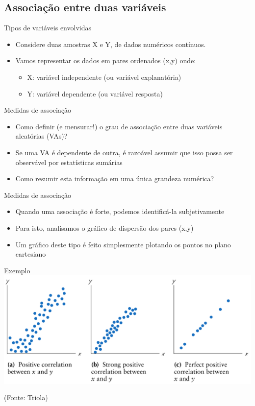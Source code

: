 \documentclass{beamer}
\begin{document}
\subsection[Associação]{Associação entre duas variáveis}

\begin{frame}{Tipos de variáveis envolvidas}
  \begin{itemize}
  \item Considere duas amostras X e Y, de dados numéricos contínuos.
  \item Vamos representar os dados em pares ordenados (x,y) onde:
    \begin{itemize}
    \item X: variável independente (ou variável explanatória)
    \item Y: variável dependente (ou variável resposta)
    \end{itemize}
  \end{itemize}
\end{frame}

\begin{frame}{Medidas de associação}
  \begin{itemize}
  \item Como definir (e mensurar!) o grau de associação entre duas
    variáveis aleatórias (VAs)?
  \item Se uma VA é dependente de outra, é razoável assumir que isso
    possa ser observável por estatísticas sumárias
  \item Como resumir esta informação em uma única grandeza numérica?
  \end{itemize}
\end{frame}

\begin{frame}{Medidas de associação}
  \begin{itemize}
  \item Quando uma associação é forte, podemos identificá-la
    subjetivamente
  \item Para isto, analisamos o gráfico de dispersão dos pares (x,y)
  \item Um gráfico deste tipo é feito simplesmente plotando os pontos
    no plano cartesiano
  \end{itemize}
\end{frame}

\begin{frame}{Exemplo}
  \includegraphics[height=0.6\textheight]{Assoc/positive}

  (Fonte: Triola)
\end{frame}
\end{document}
